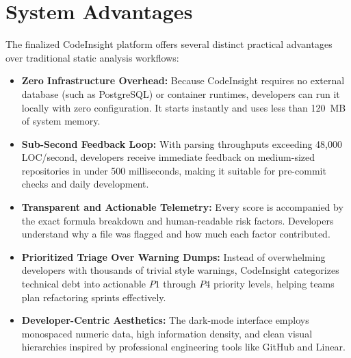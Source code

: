 \section{System Advantages}
The finalized CodeInsight platform offers several distinct practical advantages over traditional static analysis workflows:
\begin{itemize}
    \item \textbf{Zero Infrastructure Overhead:} Because CodeInsight requires no external database (such as PostgreSQL) or container runtimes, developers can run it locally with zero configuration. It starts instantly and uses less than 120~MB of system memory.
    \item \textbf{Sub-Second Feedback Loop:} With parsing throughputs exceeding 48,000 LOC/second, developers receive immediate feedback on medium-sized repositories in under 500 milliseconds, making it suitable for pre-commit checks and daily development.
    \item \textbf{Transparent and Actionable Telemetry:} Every score is accompanied by the exact formula breakdown and human-readable risk factors. Developers understand why a file was flagged and how much each factor contributed.
    \item \textbf{Prioritized Triage Over Warning Dumps:} Instead of overwhelming developers with thousands of trivial style warnings, CodeInsight categorizes technical debt into actionable $P1$ through $P4$ priority levels, helping teams plan refactoring sprints effectively.
    \item \textbf{Developer-Centric Aesthetics:} The dark-mode interface employs monospaced numeric data, high information density, and clean visual hierarchies inspired by professional engineering tools like GitHub and Linear.
\end{itemize}


